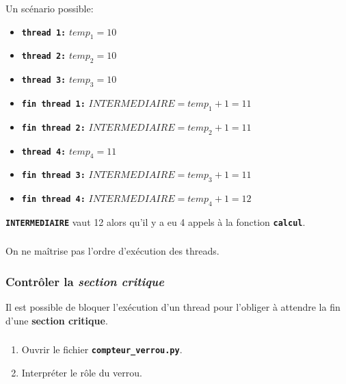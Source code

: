 \documentclass[svgnames,11pt]{beamer}
\begin{document}
\begin{frame}
    \frametitle{}

    Un scénario possible:
    \begin{itemize}
        \item \textbf{\texttt{thread 1:}} \textbf{\texttt{$temp_1=10$}}
        \item \textbf{\texttt{thread 2:}} \textbf{\texttt{$temp_2=10$}}
        \item \textbf{\texttt{thread 3:}} \textbf{\texttt{$temp_3=10$}}
        \item \textbf{\texttt{fin thread 1:}} \textbf{\texttt{$INTERMEDIAIRE=temp_1+1=11$}}
        \item \textbf{\texttt{fin thread 2:}} \textbf{\texttt{$INTERMEDIAIRE=temp_2+1=11$}}
        \item \textbf{\texttt{thread 4:}} \textbf{\texttt{$temp_4=11$}}
        \item \textbf{\texttt{fin thread 3:}} \textbf{\texttt{$INTERMEDIAIRE=temp_3+1=11$}}
        \item \textbf{\texttt{fin thread 4:}} \textbf{\texttt{$INTERMEDIAIRE=temp_4+1=12$}}
    \end{itemize}
    \begin{center}
        \textbf{\texttt{INTERMEDIAIRE}} vaut 12 alors qu'il y a eu 4 appels à la fonction \textbf{\texttt{calcul}}.
    \end{center}
\end{frame}
\begin{frame}
    \frametitle{}

    \begin{aretenir}[Observation]
        On ne maîtrise pas l'ordre d'exécution des threads.
    \end{aretenir}

\end{frame}
\begin{frame}
    \frametitle{Contrôler la \emph{section critique}}

    \begin{center}
        Il est possible de bloquer l'exécution d'un thread pour l'obliger à attendre la fin d'une \textbf{section critique}.
    \end{center}

\end{frame}
\begin{frame}
    \frametitle{}

    \begin{activite}
        \begin{enumerate}
            \item Ouvrir le fichier \textbf{\texttt{compteur\_verrou.py}}.
            \item Interpréter le rôle du verrou.
        \end{enumerate}
    \end{activite}

\end{frame}
\end{document}
